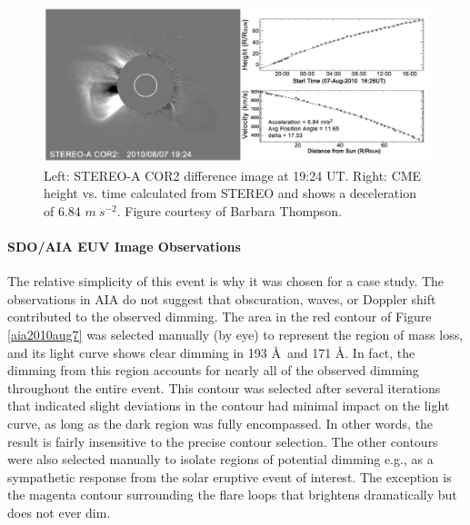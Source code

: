 \begin{figure}[!h]
    \begin{center}
	    \includegraphics[width=150mm]{Images/Stereo2010Aug7Cme.png}
    \end{center}
    \caption[LASCO coronagraph data for 2010 August 7 event]{
        Left: STEREO-A COR2 difference image at 19:24 UT. Right: CME height vs. time calculated from STEREO and shows a 
        deceleration of 6.84 $m\ s^{-2}$. Figure courtesy of Barbara Thompson. 
	}
    \label{stereo2010aug7}
\end{figure}

\paragraph{SDO/AIA EUV Image Observations}
The relative simplicity of this event is why it was chosen for a case study. The observations in AIA do not suggest that obscuration, waves, or Doppler shift contributed to the observed dimming. The area in the red contour of Figure \ref{aia2010aug7} was selected manually (by eye) to represent the region of mass loss, and its light curve shows clear dimming in 193 \AA\ and 171 \AA. In fact, the dimming from this region accounts for nearly all of the observed dimming throughout the entire event. This contour was selected after several iterations that indicated slight deviations in the contour had minimal impact on the light curve, as long as the dark region was fully encompassed. In other words, the result is fairly insensitive to the precise contour selection. The other contours were also selected manually to isolate regions of potential dimming e.g., as a sympathetic response from the solar eruptive event of interest. The exception is the magenta contour surrounding the flare loops that brightens dramatically but does not ever dim. 

